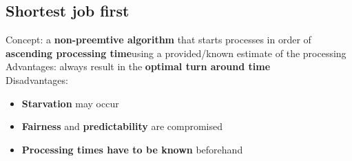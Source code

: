 \documentclass{article}
\begin{document}
\begin{center}
\end{center}
\pagebreak

\subsection{Shortest job first}
\begin{flushleft}
Concept: a \textbf{non-preemtive algorithm} that starts processes in order of
\textbf{ascending processing time}using a provided/known estimate of the processing\\
Advantages: always result in the \textbf{optimal turn around time}\\
Disadvantages:
\begin{itemize}
	\item \textbf{Starvation} may occur
	\item \textbf{Fairness} and \textbf{predictability} are compromised
	\item \textbf{Processing times have to be known} beforehand
\end{itemize}
\end{flushleft}
\begin{center}
\end{center}
\end{document}
